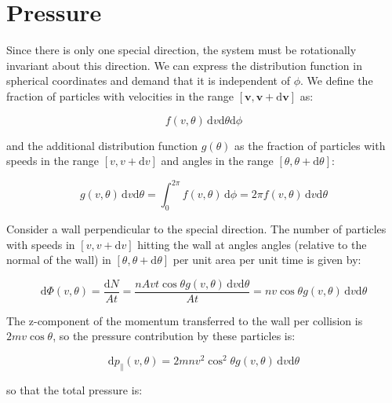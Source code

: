 \documentclass[12pt]{article}
\begin{document}
\pagebreak
\section*{Pressure}



Since there is only one special direction, the system must be rotationally invariant about this direction. We can express the distribution function in spherical coordinates and demand that it is independent of $\phi$. We define the fraction of particles with velocities in the range $[\mathbf{v}, \mathbf{v} + \mathrm{d}\mathbf{v}]$ as:

\begin{equation}
    f(v, \theta) \, \mathrm{d}v \mathrm{d}\theta \mathrm{d}\phi
\end{equation}

and the additional distribution function $g(\theta)$ as the fraction of particles with speeds in the range $[v, v + \mathrm{d}v]$ and angles in the range $[\theta, \theta + \mathrm{d}\theta]$:

\begin{equation}
    g(v, \theta) \, \mathrm{d}v \mathrm{d}\theta = \int_{0}^{2\pi} f(v, \theta) \, \mathrm{d}\phi = 2\pi f(v, \theta) \, \mathrm{d}v \mathrm{d}\theta
\end{equation}

Consider a wall perpendicular to the special direction. The number of particles with speeds in $[v, v + \mathrm{d}v]$ hitting the wall at angles angles (relative to the normal of the wall) in $[\theta, \theta + \mathrm{d}\theta]$ per unit area per unit time is given by:

\begin{equation}
    \mathrm{d}\Phi(v, \theta) = \frac{\mathrm{d}N}{At} = \frac{nAvt \cos{\theta} g(v, \theta) \, \mathrm{d}v \mathrm{d}\theta}{At} = nv \cos{\theta} g(v, \theta) \, \mathrm{d}v \mathrm{d}\theta
\end{equation}

The z-component of the momentum transferred to the wall per collision is $2mv \cos{\theta}$, so the pressure contribution by these particles is:

\begin{equation}
    \mathrm{d}p_{\parallel}(v, \theta) = 2mnv^{2} \cos^{2}{\theta} g(v, \theta) \, \mathrm{d}v \mathrm{d}\theta
\end{equation}

so that the total pressure is:
\end{document}
